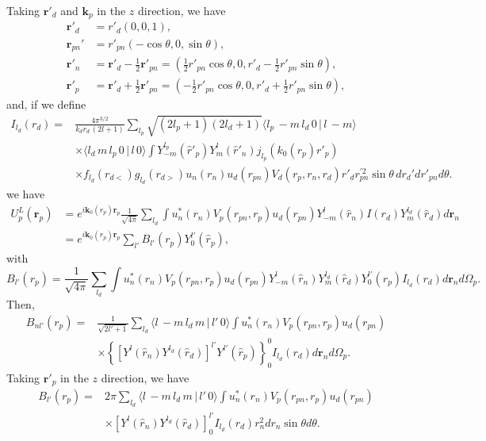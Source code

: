 \documentclass[a4paper,11pt]{article}
\begin{document}
Taking $\mathbf r'_d$ and $\mathbf k_p$ in the $z$ direction, we have
\begin{align}\label{eq43}
\nonumber\mathbf r'_d&=r'_d\left(0,0,1\right),\\
\nonumber\mathbf r_{pn}'&=r'_{pn}\left(-\cos\theta,0,\sin\theta\right),\\
\nonumber \mathbf r'_{n}&=\mathbf r'_d-\frac{1}{2}\mathbf r'_{pn}=\left(\frac{1}{2}r'_{pn}\cos\theta,0,r'_d-\frac{1}{2}r'_{pn}\sin\theta\right),\\
 \mathbf r'_{p}&=\mathbf r'_d+\frac{1}{2}\mathbf r'_{pn}=\left(-\frac{1}{2}r'_{pn}\cos\theta,0,r'_d+\frac{1}{2}r'_{pn}\sin\theta\right),
\end{align}
and, if we define
 \begin{align}\label{eq48}
\nonumber I_{l_d}(r_d)=&\frac{4\pi^{3/2}}{k_dr_d\,(2l+1)}\sum_{l_p}\sqrt{(2l_p+1)(2l_d+1)}\langle l_p\,-m\,l_d\,0\,|\,l\,-m\rangle\\
\nonumber&\times\langle l_d\,m\,l_p\,0\,|\,l\,0\rangle  \int  Y^{l_p}_{-m}(\hat r'_p)Y^{l}_{m}(\hat r'_n)j_{l_p}(k_0(r_p) r'_p)\\
&\times f_{l_d}(r_{d<})g_{l_d}(r_{d>})u_n(r_n)u_d(r_{pn}) V_{d}(r_{p},r_n,r_d) r'_dr_{pn}^{'2}\sin\theta\, d r_d'dr'_{pn}d\theta.
 \end{align}
 we have
 \begin{align}\label{eq53}
 \nonumber U^L_p(\mathbf r_p)&=e^{i\mathbf k_0(r_p)\mathbf r_p}\frac{1}{\sqrt{4\pi}}\sum_{l_d} \int u_n^*(r_n)V_p(r_{pn},r_p)u_d(r_{pn})  Y^{l}_{-m}(\hat r_n) I(r_d)Y^{l_d}_m(\hat r_d)d\mathbf r_n\\
 &=e^{i\mathbf k_0(r_p)\mathbf r_p}\sum_{l'}B_{l'}(r_p)Y_0^{l'}(\hat r_p),
 \end{align}
 with 
 \begin{equation}\label{eq54}
 B_{l'}(r_p)=\frac{1}{\sqrt{4\pi}}\sum_{l_d}\int u_n^*(r_n)V_p(r_{pn},r_p)u_d(r_{pn})  Y^{l}_{-m}(\hat r_n)Y^{l_d}_m(\hat r_d)Y^{l'}_0(\hat r_p) I_{l_d}(r_d)d\mathbf r_nd\Omega_p.
 \end{equation}
Then,
 \begin{align}\label{eq55}
 \nonumber B_{nl'}(r_p)=&\frac{1}{\sqrt{2l'+1}}\sum_{l_d}\langle l\,-m\,l_d\,m\,|\,l'\,0\rangle\int u_n^*(r_n)V_p(r_{pn},r_p)u_d(r_{pn})\\
 &\times  \left\{\left[Y^{l}(\hat r_n)Y^{l_d}(\hat r_d)\right]^{l'}Y^{l'}(\hat r_p)\right\}^0_0 I_{l_d}(r_d)d\mathbf r_nd\Omega_p.
 \end{align}
 Taking $\mathbf r'_p$ in the $z$ direction, we have
  \begin{align}\label{eq56}
  \nonumber B_{l'}(r_p)=&2\pi\sum_{l_d}\langle l\,-m\,l_d\,m\,|\,l'\,0\rangle\int u_n^*(r_n)V_p(r_{pn},r_p)u_d(r_{pn})\\
  &\times  \left[Y^{l}(\hat r_n)Y^{l_d}(\hat r_d)\right]^{l'}_0 I_{l_d}(r_d)r^2_n d r_n \sin\theta d\theta.
  \end{align}
\end{document}
